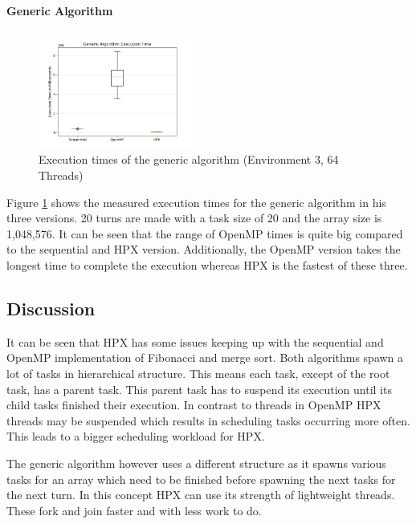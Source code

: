 \paragraph{Generic Algorithm}
  \begin{figure}[htbp]
	\centering
	\includegraphics[width=0.45\textwidth]{figures/generic_NoOp.png}
	\caption{Execution times of the generic algorithm (Environment 3, 64 Threads)}
	\label{fig:gen_NoOp}
\end{figure}
Figure \ref{fig:gen_NoOp} shows the measured execution times for the generic algorithm in his three versions.
20 turns are made with a task size of 20 and the array size is 1,048,576.
It can be seen that the range of OpenMP times is quite big compared to the sequential and HPX version.
Additionally, the OpenMP version takes the longest time to complete the execution whereas HPX is the fastest of these three. 

\subsection{Discussion}
It can be seen that HPX has some issues keeping up with the sequential and OpenMP implementation of Fibonacci and merge sort.
Both algorithms spawn a lot of tasks in hierarchical structure.
This means each task, except of the root task, has a parent task.
This parent task has to suspend its execution until its child tasks finished their execution.
In contrast to threads in OpenMP HPX threads may be suspended which results in scheduling tasks occurring more often.
This leads to a bigger scheduling workload for HPX.

The generic algorithm however uses a different structure as it spawns various tasks for an array which need to be finished before spawning the next tasks for the next turn.
In this concept HPX can use its strength of lightweight threads.
These fork and join faster and with less work to do.


